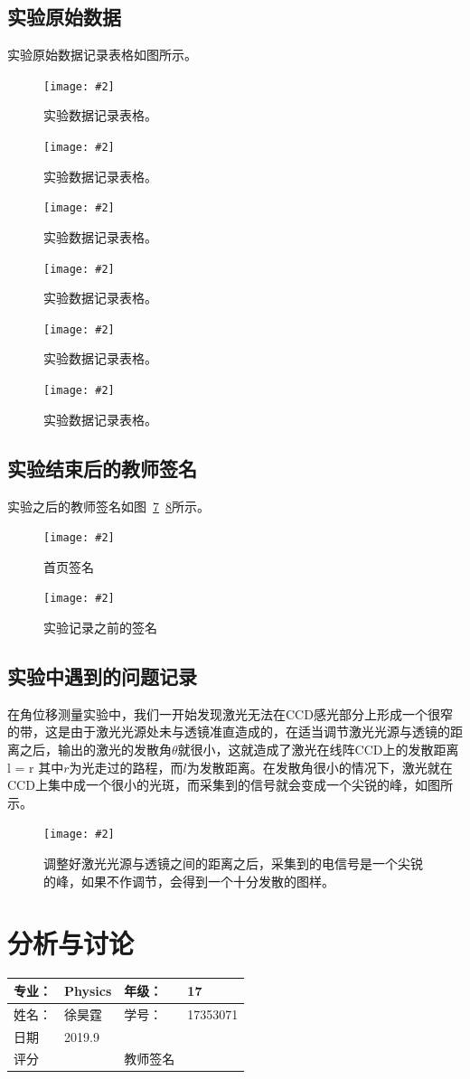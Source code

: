 \documentclass{ctexart}
\newcommand{\cpic}[2]{
\begin{center}
\texttt{[image: \#2]}
\end{center}
}
\newcommand{\cpicn}[3]
{
\begin{figure}[H]
\cpic{#1}{#2}
\caption{#3\label{#2}}
\end{figure}
}
\begin{document}
\subsection{实验原始数据}
实验原始数据记录表格如图所示。
\cpicn{0.2}{1}{实验数据记录表格。}
\cpicn{0.2}{2}{实验数据记录表格。}
\cpicn{0.2}{3}{实验数据记录表格。}
\cpicn{0.2}{4}{实验数据记录表格。}
\cpicn{0.2}{5}{实验数据记录表格。}
\cpicn{0.2}{6}{实验数据记录表格。}

\subsection{实验结束后的教师签名}
实验之后的教师签名如图~\ref{sign_1}~\ref{sign_2}所示。
\cpicn{0.3}{sign_1}{首页签名}
\cpicn{0.3}{sign_2}{实验记录之前的签名}

\subsection{实验中遇到的问题记录}
在角位移测量实验中，我们一开始发现激光无法在CCD感光部分上形成一个很窄的带，这是由于激光光源处未与透镜准直造成的，在适当调节激光光源与透镜的距离之后，输出的激光的发散角$\theta$就很小，这就造成了激光在线阵CCD上的发散距离
\beq
l = r\theta
\eeq
其中$r$为光走过的路程，而$l$为发散距离。在发散角很小的情况下，激光就在CCD上集中成一个很小的光斑，而采集到的信号就会变成一个尖锐的峰，如图所示。
\cpicn{0.2}{sharp}{\color{red} 调整好激光光源与透镜之间的距离之后，采集到的电信号是一个尖锐的峰，如果不作调节，会得到一个十分发散的图样。}
\newpage        
\section{分析与讨论}
\begin{tabular}{|p{8em}|p{8em}|p{8em}|p{8em}|}
	\hline 
	专业：     &Physics       &年级：      & 17     \\
	\hline
	姓名：& 徐昊霆 &学号：&17353071  \\
	\hline
	日期&     2019.9               & &  \\
	\hline	
	评分 & & 教师签名 & \\
	\hline
\end{tabular}
\end{document}
